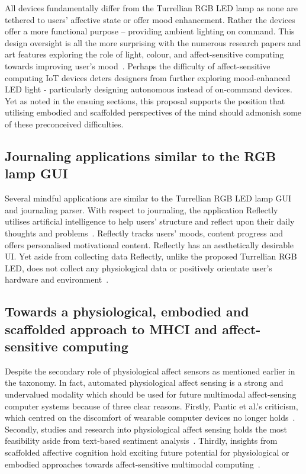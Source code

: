 \documentclass{sigchi}
\begin{document}
All devices fundamentally differ from the Turrellian RGB LED lamp as none are tethered to users’ affective state or offer mood enhancement. Rather the devices offer a more functional purpose – providing ambient lighting on command. This design oversight is all the more surprising with the numerous research papers and art features exploring the role of light, colour, and affect-sensitive computing towards improving user’s mood~\cite{lee2019effects, wardono2012effects, yang2015lighting}. Perhaps the difficulty of affect-sensitive computing IoT devices deters designers from further exploring mood-enhanced LED light - particularly designing autonomous instead of on-command devices. Yet as noted in the ensuing sections, this proposal supports the position that utilising embodied and scaffolded perspectives of the mind should admonish some of these preconceived difficulties. 

\subsection{Journaling applications similar to the RGB lamp GUI}

Several mindful applications are similar to the Turrellian RGB LED lamp GUI and journaling parser. With respect to journaling, the application Reflectly utilises artificial intelligence to help users’ structure and reflect upon their daily thoughts and problems~\cite{Reflectly01}. Reflectly tracks users’ moods, content progress and offers personalised motivational content. Reflectly has an aesthetically desirable UI. Yet aside from collecting data Reflectly, unlike the proposed Turrellian RGB LED, does not collect any physiological data or positively orientate user’s hardware and environment~\cite{Reflectly01}.

\subsection{Towards a physiological, embodied and scaffolded approach to MHCI and affect-sensitive computing}

Despite the secondary role of physiological affect sensors as mentioned earlier in the taxonomy. In fact, automated physiological affect sensing is a strong and undervalued modality which should be used for future multimodal affect-sensing computer systems because of three clear reasons. Firstly, Pantic et al.’s criticism, which centred on the discomfort of wearable computer devices no longer holds~\cite{pantic2008human, pantic2003toward, 6634207}. Secondly, studies and research into physiological affect sensing holds the most feasibility aside from text-based sentiment analysis~\cite{goshvarpour2017fusion, goshvarpour2017indices, goshvarpour2017discrimination}. Thirdly, insights from scaffolded affective cognition hold exciting future potential for physiological or embodied approaches towards affect-sensitive multimodal computing~\cite{colombetti2015scaffoldings}. 
\end{document}
